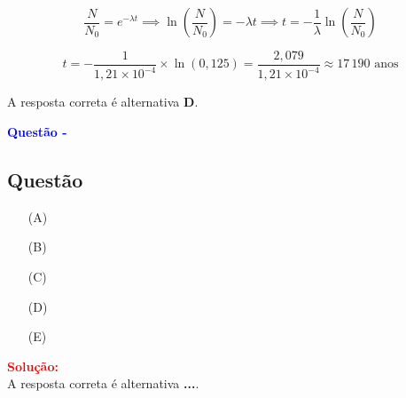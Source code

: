 \begin{flushleft}
\vspace{0.3cm}


\[
\frac{N}{N_0} = e^{-\lambda t} \implies \ln\left(\frac{N}{N_0}\right) = -\lambda t \implies t = -\frac{1}{\lambda} \ln\left(\frac{N}{N_0}\right)
\]

\vspace{0.3cm}


\[
t = -\frac{1}{1{,}21 \times 10^{-4}} \times \ln(0{,}125) = \frac{2{,}079}{1{,}21 \times 10^{-4}} \approx 17\,190 \text{ anos}
\]

\vspace{0.3cm}


A resposta correta é alternativa \colorbox{green!50}{\textbf{D}}.
\end{flushleft}



\begin{flushleft}
\textbf{\textcolor{blue}{\Large Quest\~ao - }}\\
\noindent

\subsection{Quest\~ao }

\begin{itemize}
\item[(A)] 
\item[(B)] 
\item[(C)]
\item[(D)] 
\item[(E)] 
\end{itemize}

\vspace{0.5cm}

\textcolor{red}{\textbf{Solução:}}\\


A resposta correta é alternativa \colorbox{green!50}{\textbf{...}}.

\end{flushleft}